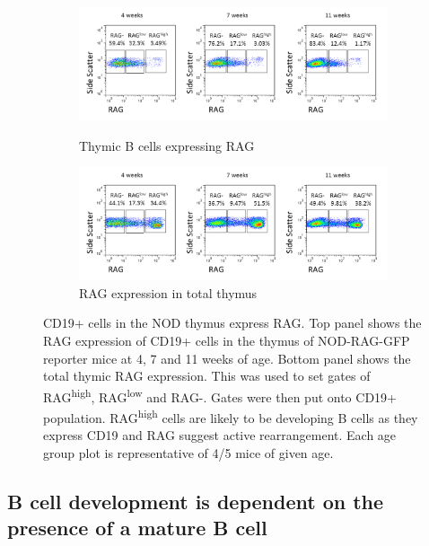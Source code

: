 \begin{figure}
	\begin{subfigure}{\textwidth}
	\includegraphics[width=\textwidth]{Figures/RAGhighlownegthyB.png}
	\caption{Thymic B cells expressing RAG}
	\includegraphics[width=\textwidth]{Figures/RAGhighlownegtotalthy.png}
	\caption{RAG expression in total thymus}
	\end{subfigure}
\caption{CD19+ cells in the NOD thymus express RAG. 
Top panel shows the RAG expression of CD19+ cells in the thymus of NOD-RAG-GFP reporter mice at 4, 7 and 11 weeks of age. Bottom panel shows the total thymic RAG expression. 
This was used to set gates of RAG\textsuperscript{high}, RAG\textsuperscript{low} and RAG-. Gates were then put onto CD19+ population. 
RAG\textsuperscript{high} cells are likely to be developing B cells as they express CD19 and RAG suggest active rearrangement. 
Each age group plot is representative of 4/5 mice of given age.}
\end{figure}




\subsection{B cell development is dependent on the presence of a mature B cell}

